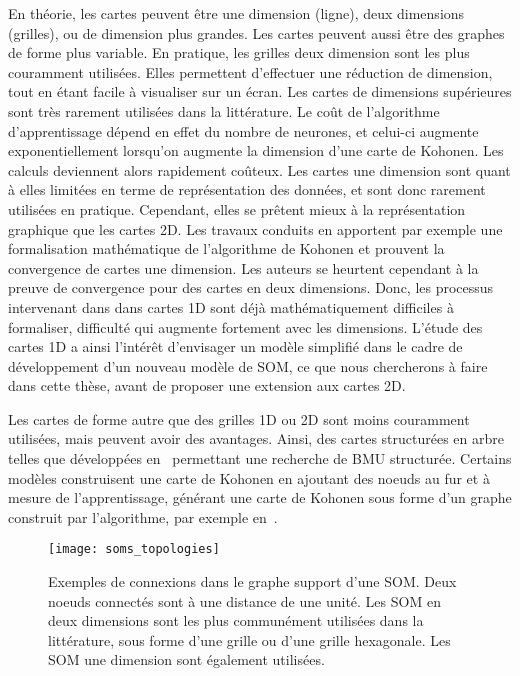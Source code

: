 \documentclass[../main]{subfiles}
\begin{document}
En théorie, les cartes peuvent être une dimension (ligne), deux dimensions (grilles), ou de dimension plus grandes. Les cartes peuvent aussi être des graphes de forme plus variable. En pratique, les grilles deux dimension sont les plus couramment utilisées. Elles permettent d'effectuer une réduction de dimension, tout en étant facile à visualiser sur un écran. Les cartes de dimensions supérieures sont très rarement utilisées dans la littérature. Le coût de l'algorithme d'apprentissage dépend en effet du nombre de neurones, et celui-ci augmente exponentiellement lorsqu'on augmente la dimension d'une carte de Kohonen. Les calculs deviennent alors rapidement coûteux.
Les cartes une dimension sont quant à elles limitées en terme de représentation des données, et sont donc rarement utilisées en pratique. Cependant, elles se prêtent mieux à la représentation graphique que les cartes 2D.
Les travaux conduits en \cite{cottrell_theoretical_2016,fort_soms_2006} apportent par exemple une formalisation mathématique de l'algorithme de Kohonen et prouvent la convergence de cartes une dimension. Les auteurs se heurtent cependant à la preuve de convergence pour des cartes en deux dimensions. Donc, les processus intervenant dans dans cartes 1D sont déjà mathématiquement difficiles à formaliser, difficulté qui augmente fortement avec les dimensions.
L'étude des cartes 1D a ainsi l'intérêt d'envisager un modèle simplifié dans le cadre de développement d'un nouveau modèle de SOM, ce que nous chercherons à faire dans cette thèse, avant de proposer une extension aux cartes 2D.

Les cartes de forme autre que des grilles 1D ou 2D sont moins couramment utilisées, mais peuvent avoir des avantages. Ainsi, des cartes structurées en arbre telles que développées en~\cite{koikkalainen_self-organizing_1990, } permettant une recherche de BMU structurée. Certains modèles construisent une carte de Kohonen en ajoutant des noeuds au fur et à mesure de l'apprentissage, générant une carte de Kohonen sous forme d'un graphe construit par l'algorithme, par exemple en~\cite{alahakoon_dynamic_2000, yamaguchi_adaptive_2010}.

\begin{figure}
\centering
\texttt{[image: soms\_topologies]}
\caption{Exemples de connexions dans le graphe support d'une SOM. Deux noeuds connectés sont à une distance de une unité. Les SOM en deux dimensions sont les plus communément utilisées dans la littérature, sous forme d'une grille ou d'une grille hexagonale. Les SOM une dimension sont également utilisées.}
\label{fig:topo}
\end{figure}
\end{document}
